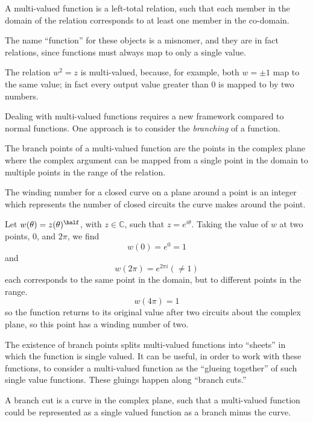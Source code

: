 \begin{definition}
  A multi-valued function is a left-total relation, such that each
  member in the domain of the relation corresponds to at least one
  member in the co-domain.
\end{definition}
The name ``function'' for these objects is a misnomer, and they are in
fact relations, since functions must always map to only a single
value.
\begin{example}
  The relation $w^2 = z$ is multi-valued, because, for example, both
  $w=\pm 1$ map to the same value; in fact every output value greater
  than 0 is mapped to by two numbers.
\end{example}
Dealing with multi-valued functions requires a new framework compared
to normal functions. One approach is to consider the \emph{branching}
of a function.
\begin{definition}
  The branch points of a multi-valued function are the points in the
  complex plane where the complex argument can be mapped from a single
  point in the domain to multiple points in the range of the relation.
\end{definition}
\begin{definition}
  The winding number for a closed curve on a plane around a point is
  an integer which represents the number of closed circuits the curve
  makes around the point.
\end{definition}
\begin{example}
  Let $w(\theta) = z(\theta)^{\half}$, with $z \in \mathbb{C}$, such that $z = e^{i
    \theta}$. Taking the value of $w$ at two points, $0$, and $2 \pi$,
  we find
  \[ w(0) = e^0 = 1 \] and \[ w(2\pi) = e^{2 \pi i} ( \neq 1) \]
each corresponds to the same point in the domain, but to different points in the range.
\[ w(4 \pi) = 1 \] so the function returns to its original value after
two circuits about the complex plane, so this point has a winding number of two.
\end{example}
The existence of branch points splits multi-valued functions into
``sheets'' in which the function is single valued. It can be useful,
in order to work with these functions, to consider a multi-valued
function as the ``glueing together'' of such single value
functions. These gluings happen along ``branch cuts.''
\begin{definition}
  A branch cut is a curve in the complex plane, such that a
  multi-valued function could be represented as a single valued
  function as a branch minus the curve.
\end{definition}
